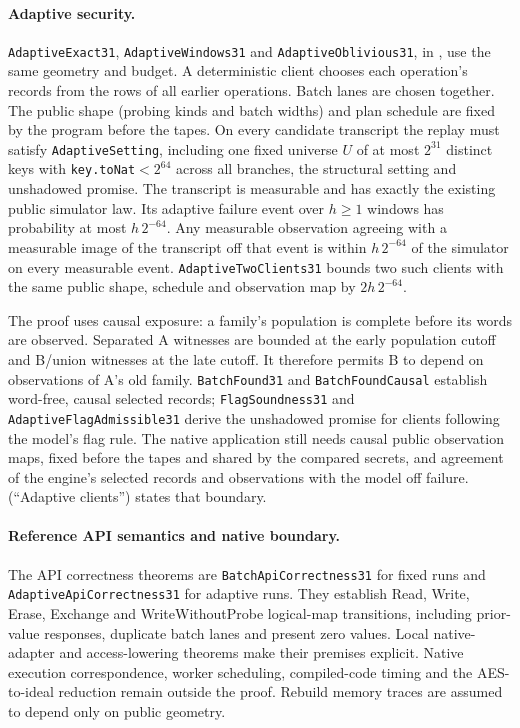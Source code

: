 \documentclass[11pt]{article}
\theoremstyle{definition}
\theoremstyle{remark}
\begin{document}
\paragraph{Adaptive security.}
\texttt{AdaptiveExact31}, \texttt{AdaptiveWindows31} and
\texttt{AdaptiveOblivious31}, in ,
use the same geometry and budget. A deterministic client chooses each
operation's records from the rows of all earlier operations. Batch lanes are
chosen together. The public shape (probing kinds and batch widths) and plan
schedule are fixed by the program before the tapes. On every candidate
transcript the replay must satisfy \texttt{AdaptiveSetting}, including one
fixed universe $U$ of at most $2^{31}$ distinct keys with \texttt{key.toNat}$<2^{64}$ across all
branches, the structural setting and unshadowed promise.
The transcript is measurable and has exactly the existing public simulator
law. Its adaptive failure event over $h\ge1$ windows has probability at most
$h\,2^{-64}$. Any measurable observation agreeing with a measurable image of
the transcript off that event is within $h\,2^{-64}$ of the simulator on
every measurable event. \texttt{AdaptiveTwoClients31} bounds two such clients
with the same public shape, schedule and observation map by $2h\,2^{-64}$.

The proof uses causal exposure: a family's population is complete before its
words are observed. Separated A witnesses are bounded at the early population
cutoff and B/union witnesses at the late cutoff. It therefore permits B to
depend on observations of A's old family. \texttt{BatchFound31} and
\texttt{BatchFoundCausal} establish word-free, causal selected records;
\texttt{FlagSoundness31} and \texttt{AdaptiveFlagAdmissible31} derive the
unshadowed promise for clients following the model's flag rule.
The native application still needs causal public observation maps, fixed
before the tapes and shared by the compared secrets, and agreement of the
engine's selected records and observations with the model off failure.
 (``Adaptive clients'') states that boundary.

\paragraph{Reference API semantics and native boundary.}
The API correctness theorems are \texttt{BatchApiCorrectness31} for fixed runs
and \texttt{AdaptiveApiCorrectness31} for adaptive runs. They establish Read,
Write, Erase, Exchange and WriteWithoutProbe logical-map transitions,
including prior-value responses, duplicate batch lanes and present zero
values. Local native-adapter and access-lowering theorems make their premises
explicit. Native execution correspondence, worker scheduling, compiled-code
timing and the AES-to-ideal reduction remain outside the proof.
Rebuild memory traces are assumed to depend only on public geometry.
\end{document}
